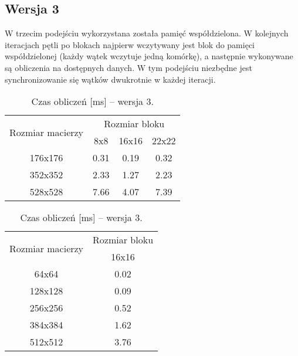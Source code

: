
\subsection{Wersja 3}

W trzecim podejściu wykorzystana została pamięć współdzielona. W kolejnych iteracjach pętli po blokach najpierw wczytywany jest blok do pamięci współdzielonej (każdy wątek wczytuje jedną komórkę), a następnie wykonywane są obliczenia na dostępnych danych. W tym podejściu niezbędne jest synchronizowanie się wątków dwukrotnie w każdej iteracji.



\begin{table}[H]
\centering
\begin{tabular}{|c|c|c|c|}
\hline
\multirow{2}{*}{Rozmiar macierzy} & \multicolumn{3}{c|}{Rozmiar bloku} \\ \cline{2-4}
& 8x8 & 16x16 & 22x22 \\ \hline
176x176 & 0.31 & 0.19 & 0.32 \\ \hline
352x352 & 2.33 & 1.27 & 2.23 \\ \hline
528x528 & 7.66 & 4.07 & 7.39 \\ \hline
\end{tabular}
\caption{Czas obliczeń [ms] -- wersja 3.}
\end{table}

\begin{table}[H]
\centering
\begin{tabular}{|c|c|}
\hline
\multirow{2}{*}{Rozmiar macierzy} & \multicolumn{1}{c|}{Rozmiar bloku} \\ \cline{2-2}
& 16x16 \\ \hline
64x64 & 0.02 \\ \hline
128x128 & 0.09 \\ \hline
256x256 & 0.52 \\ \hline
384x384 & 1.62 \\ \hline
512x512 & 3.76 \\ \hline
\end{tabular}
\caption{Czas obliczeń [ms] -- wersja 3.}
\end{table}
